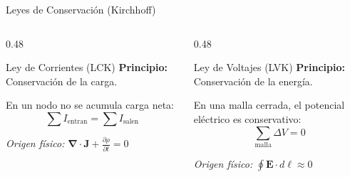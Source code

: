 \documentclass[10pt, aspectratio=169, handout]{beamer}
\begin{document}
\begin{frame}{Leyes de Conservación (Kirchhoff)}
    \begin{columns}[T]
        \begin{column}{0.48\textwidth}
            \pause
            \begin{boxTeoria}{Ley de Corrientes (LCK)}
                \textbf{Principio:} Conservación de la carga.

                \vspace{0.2cm}
                En un nodo no se acumula carga neta:
                \[ \sum I_{\text{entran}} = \sum I_{\text{salen}} \]

                \vfill
                \footnotesize{\textit{Origen físico:} $\bm{\nabla} \cdot \bm{J} + \frac{\partial\rho}{\partial t} = 0$}
            \end{boxTeoria}
        \end{column}

        \begin{column}{0.48\textwidth}
            \pause
            \begin{boxTeoria}{Ley de Voltajes (LVK)}
                \textbf{Principio:} Conservación de la energía.

                \vspace{0.2cm}
                En una malla cerrada, el potencial eléctrico es conservativo:
                \[ \sum_{\text{malla}} \Delta V = 0 \]

                \vfill
                \footnotesize{\textit{Origen físico:} $\oint \bm{E} \cdot d\bm{\ell} \approx 0$}
            \end{boxTeoria}
        \end{column}
    \end{columns}
\end{frame}
\end{document}
